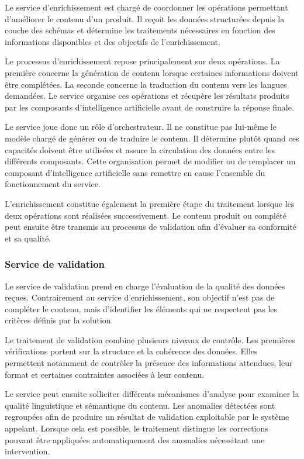 Le service d'enrichissement est chargé de coordonner les opérations permettant d'améliorer le contenu d'un produit. Il reçoit les données structurées depuis la couche des schémas et détermine les traitements nécessaires en fonction des informations disponibles et des objectifs de l'enrichissement.

Le processus d'enrichissement repose principalement sur deux opérations. La première concerne la génération de contenu lorsque certaines informations doivent être complétées. La seconde concerne la traduction du contenu vers les langues demandées. Le service organise ces opérations et récupère les résultats produits par les composants d'intelligence artificielle avant de construire la réponse finale.

Le service joue donc un rôle d'orchestrateur. Il ne constitue pas lui-même le modèle chargé de générer ou de traduire le contenu. Il détermine plutôt quand ces capacités doivent être utilisées et assure la circulation des données entre les différents composants. Cette organisation permet de modifier ou de remplacer un composant d'intelligence artificielle sans remettre en cause l'ensemble du fonctionnement du service.

L'enrichissement constitue également la première étape du traitement lorsque les deux opérations sont réalisées successivement. Le contenu produit ou complété peut ensuite être transmis au processus de validation afin d'évaluer sa conformité et sa qualité.

\subsubsection{Service de validation}

Le service de validation prend en charge l'évaluation de la qualité des données reçues. Contrairement au service d'enrichissement, son objectif n'est pas de compléter le contenu, mais d'identifier les éléments qui ne respectent pas les critères définis par la solution.

Le traitement de validation combine plusieurs niveaux de contrôle. Les premières vérifications portent sur la structure et la cohérence des données. Elles permettent notamment de contrôler la présence des informations attendues, leur format et certaines contraintes associées à leur contenu.

Le service peut ensuite solliciter différents mécanismes d'analyse pour examiner la qualité linguistique et sémantique du contenu. Les anomalies détectées sont regroupées afin de produire un résultat de validation exploitable par le système appelant. Lorsque cela est possible, le traitement distingue les corrections pouvant être appliquées automatiquement des anomalies nécessitant une intervention.

